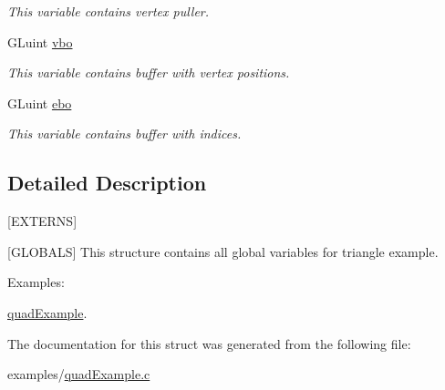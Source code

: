 \begin{DoxyCompactItemize}
\begin{DoxyCompactList}\small\item\em This variable contains vertex puller. \end{DoxyCompactList}\item 
\hypertarget{structQuadExampleVariables_a69515fd546272c117e14f784221f6412}{}G\+Luint \hyperlink{structQuadExampleVariables_a69515fd546272c117e14f784221f6412}{vbo}\label{structQuadExampleVariables_a69515fd546272c117e14f784221f6412}

\begin{DoxyCompactList}\small\item\em This variable contains buffer with vertex positions. \end{DoxyCompactList}\item 
\hypertarget{structQuadExampleVariables_a3b1abdb0f18593a0ebec8dd9a222164b}{}G\+Luint \hyperlink{structQuadExampleVariables_a3b1abdb0f18593a0ebec8dd9a222164b}{ebo}\label{structQuadExampleVariables_a3b1abdb0f18593a0ebec8dd9a222164b}

\begin{DoxyCompactList}\small\item\em This variable contains buffer with indices. \end{DoxyCompactList}\end{DoxyCompactItemize}


\subsection{Detailed Description}
\mbox{[}E\+X\+T\+E\+R\+N\+S\mbox{]} 

\mbox{[}G\+L\+O\+B\+A\+L\+S\mbox{]} This structure contains all global variables for triangle example. \begin{Desc}
\item[Examples\+: ]\par
\hyperlink{quadExample-example}{quad\+Example}.\end{Desc}


The documentation for this struct was generated from the following file\+:\begin{DoxyCompactItemize}
\item 
examples/\hyperlink{quadExample_8c}{quad\+Example.\+c}\end{DoxyCompactItemize}
